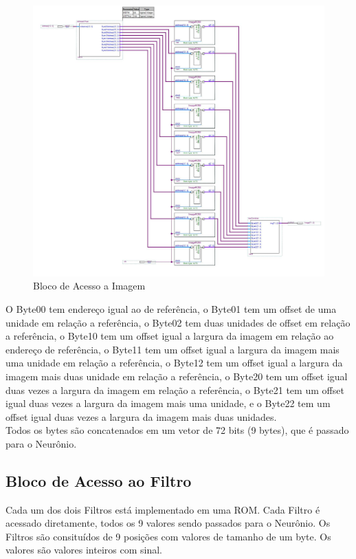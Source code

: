 \documentclass[12pt]{article}
\begin{document}
\begin{figure}[h]
	\centering
	\includegraphics[width=.8\textwidth]{CNN_Layer-Image.jpg}
	\caption{Bloco de Acesso a Imagem}
	\label{fig:image_block}
\end{figure}

O Byte00 tem endereço igual ao de referência, o Byte01 tem um offset de uma unidade em relação
a referência, o Byte02 tem duas unidades de offset em relação a referência,
o Byte10 tem um offset igual a largura da imagem em relação ao endereço de referência,
o Byte11 tem um offset igual a largura da imagem mais uma unidade em relação a referência,
o Byte12 tem um offset igual a largura da imagem mais duas unidade em relação a referência,
o Byte20 tem um offset igual duas vezes a largura da imagem em relação a referência,
o Byte21 tem um offset igual duas vezes a largura da imagem mais uma unidade, e
o Byte22 tem um offset igual duas vezes a largura da imagem mais duas unidades.\\

Todos os bytes são concatenados em um vetor de 72 bits (9 bytes), que é passado para o Neurônio.

\subsection{Bloco de Acesso ao Filtro}

Cada um dos dois Filtros está implementado em uma ROM. Cada Filtro é acessado diretamente,
todos os 9 valores sendo passados para o Neurônio. Os Filtros são consituídos de 9 posições
com valores de tamanho de um byte. Os valores são valores inteiros com sinal.\\
\end{document}
